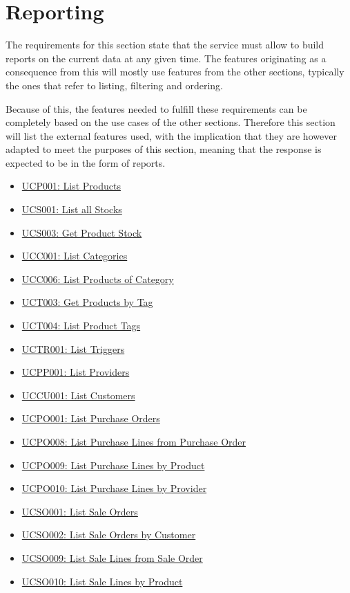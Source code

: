 \section{Reporting}
The requirements for this section state that the service must allow to build reports on the current data at any given time. The features originating as a consequence from this will mostly use features from the other sections, typically the ones that refer to listing, filtering and ordering.

Because of this, the features needed to fulfill these requirements can be completely based on the use cases of the other sections. Therefore this section will list the external features used, with the implication that they are however adapted to meet the purposes of this section, meaning that the response is expected to be in the form of reports.
\hfill\break
\begin{itemize}
\item \hyperref[UCP001]{UCP001: List Products}
\item \hyperref[UCS001]{UCS001: List all Stocks}
\item \hyperref[UCS003]{UCS003: Get Product Stock}
\item \hyperref[UCC001]{UCC001: List Categories}
\item \hyperref[UCC006]{UCC006: List Products of Category}
\item \hyperref[UCT003]{UCT003: Get Products by Tag}
\item \hyperref[UCT004]{UCT004: List Product Tags}
\item \hyperref[UCTR001]{UCTR001: List Triggers}
\item \hyperref[UCPP001]{UCPP001: List Providers}
\item \hyperref[UCCU001]{UCCU001: List Customers}
\item \hyperref[UCPO001]{UCPO001: List Purchase Orders}
\item \hyperref[UCPO008]{UCPO008: List Purchase Lines from Purchase Order}
\item \hyperref[UCPO009]{UCPO009: List Purchase Lines by Product}
\item \hyperref[UCPO010]{UCPO010: List Purchase Lines by Provider}
\item \hyperref[UCSO001]{UCSO001: List Sale Orders}
\item \hyperref[UCSO002]{UCSO002: List Sale Orders by Customer}
\item \hyperref[UCSO009]{UCSO009: List Sale Lines from Sale Order}
\item \hyperref[UCSO010]{UCSO010: List Sale Lines by Product}
\end{itemize}
\hfill\break

